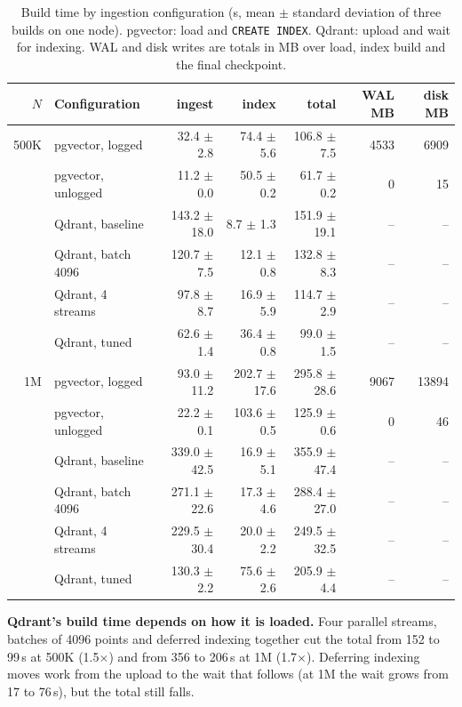 \documentclass[sigconf, nonacm]{acmart}
\begin{document}
\begin{table}[t]
  \caption{Build time by ingestion configuration (s, mean $\pm$ standard deviation of three
  builds on one node). pgvector: load and \texttt{CREATE INDEX}. Qdrant: upload and wait for
  indexing. WAL and disk writes are totals in MB over load, index build and the final
  checkpoint.}
  \label{tab:ingest}
  \small
  \begin{tabular}{rl|rrr|rr}
    \toprule
    $N$ & Configuration & ingest & index & total & WAL MB & disk MB \\
    \midrule
    500K & pgvector, logged & 32.4 $\pm$ 2.8 & 74.4 $\pm$ 5.6 & 106.8 $\pm$ 7.5 & 4533 & 6909 \\
     & pgvector, unlogged & 11.2 $\pm$ 0.0 & 50.5 $\pm$ 0.2 & 61.7 $\pm$ 0.2 & 0 & 15 \\
     & Qdrant, baseline & 143.2 $\pm$ 18.0 & 8.7 $\pm$ 1.3 & 151.9 $\pm$ 19.1 & -- & -- \\
     & Qdrant, batch 4096 & 120.7 $\pm$ 7.5 & 12.1 $\pm$ 0.8 & 132.8 $\pm$ 8.3 & -- & -- \\
     & Qdrant, 4 streams & 97.8 $\pm$ 8.7 & 16.9 $\pm$ 5.9 & 114.7 $\pm$ 2.9 & -- & -- \\
     & Qdrant, tuned & 62.6 $\pm$ 1.4 & 36.4 $\pm$ 0.8 & 99.0 $\pm$ 1.5 & -- & -- \\
    \midrule
    1M & pgvector, logged & 93.0 $\pm$ 11.2 & 202.7 $\pm$ 17.6 & 295.8 $\pm$ 28.6 & 9067 & 13894 \\
     & pgvector, unlogged & 22.2 $\pm$ 0.1 & 103.6 $\pm$ 0.5 & 125.9 $\pm$ 0.6 & 0 & 46 \\
     & Qdrant, baseline & 339.0 $\pm$ 42.5 & 16.9 $\pm$ 5.1 & 355.9 $\pm$ 47.4 & -- & -- \\
     & Qdrant, batch 4096 & 271.1 $\pm$ 22.6 & 17.3 $\pm$ 4.6 & 288.4 $\pm$ 27.0 & -- & -- \\
     & Qdrant, 4 streams & 229.5 $\pm$ 30.4 & 20.0 $\pm$ 2.2 & 249.5 $\pm$ 32.5 & -- & -- \\
     & Qdrant, tuned & 130.3 $\pm$ 2.2 & 75.6 $\pm$ 2.6 & 205.9 $\pm$ 4.4 & -- & -- \\
    \bottomrule
  \end{tabular}
\end{table}

\textbf{Qdrant's build time depends on how it is loaded.} Four parallel streams, batches of
4096 points and deferred indexing together cut the total from 152 to 99\,s at 500K
(1.5$\times$) and from 356 to 206\,s at 1M (1.7$\times$). Deferring indexing moves work from
the upload to the wait that follows (at 1M the wait grows from 17 to 76\,s), but the total
still falls.
\end{document}
